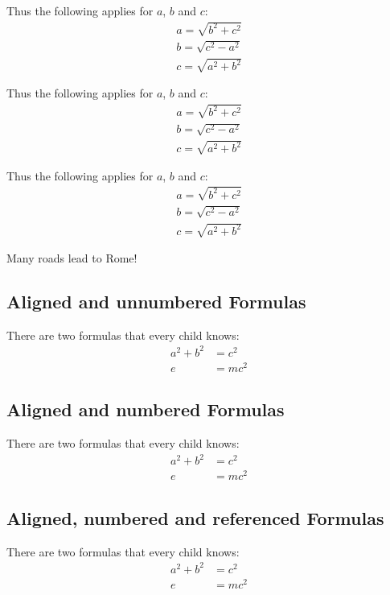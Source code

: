 \documentclass[ 12pt, a4paper, parskip=full]{scrartcl}
\begin{document}
Thus the following applies for $a$, $b$ and $c$:
\begin{gather*} %
  a=\sqrt{b^2+c^2}  \\ 
  b=\sqrt{c^2-a^2}  \\
  c=\sqrt{a^2+b^2} 
\end{gather*}

Thus the following applies for $a$, $b$ and $c$:
\begin{align*} %
  a=\sqrt{b^2+c^2}  \\ 
  b=\sqrt{c^2-a^2}  \\
  c=\sqrt{a^2+b^2} 
\end{align*}

Thus the following applies for $a$, $b$ and $c$:
\[
  \begin{array}{c} %
    a=\sqrt{b^2+c^2}  \\ 
    b=\sqrt{c^2-a^2}  \\
    c=\sqrt{a^2+b^2} 
  \end{array}
\]

Many roads lead to Rome!

\subsection{Aligned and unnumbered Formulas}
There are two formulas that every child knows: 
\begin{align*}
  a^2 + b^2 &= c^2   \\  
  e &= m c^2
\end{align*}

\subsection{Aligned and numbered Formulas}
There are two formulas that every child knows: 
\begin{align}
  a^2 + b^2 &= c^2  \\  
  e &= m c^2  
\end{align}

\subsection{Aligned, numbered and referenced Formulas}
There are two formulas that every child knows: 
\begin{align}
  a^2 + b^2 &= c^2     \label{eq.pythagoras}  \\  
  e &= m c^2           \label{eq.einstein}  
\end{align}
\end{document}
